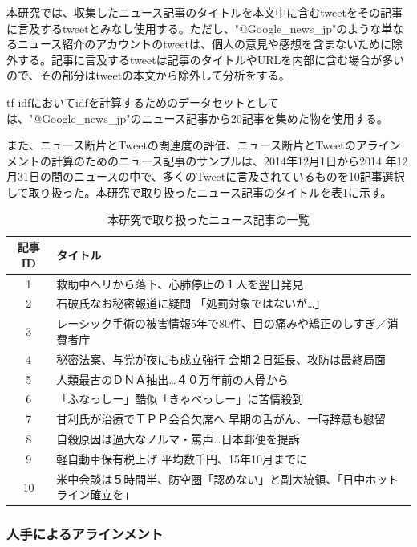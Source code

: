 \documentclass[12pt]{jarticle}
\begin{document}
本研究では、収集したニュース記事のタイトルを本文中に含むtweetをその記事に言及するtweetとみなし使用する。ただし、"@Google\_news\_jp"のような単なるニュース紹介のアカウントのtweetは、個人の意見や感想を含まないために除外する。記事に言及するtweetは記事のタイトルやURLを内部に含む場合が多いので、その部分はtweetの本文から除外して分析をする。

tf-idfにおいてidfを計算するためのデータセットとしては、"@Google\_news\_jp"のニュース記事から20記事を集めた物を使用する。

また、ニュース断片とTweetの関連度の評価、ニュース断片とTweetのアラインメントの計算のためのニュース記事のサンプルは、2014年12月1日から2014
年12月31日の間のニュースの中で、多くのTweetに言及されているものを10記事選択して取り扱った。本研究で取り扱ったニュース記事のタイトルを表\ref{news_table}に示す。

\begin{table}
\begin{center}
\caption{本研究で取り扱ったニュース記事の一覧}
\label{news_table}
\begin{tabular}[t]{|c||l|}
  \hline
  記事ID & タイトル \\
  \hline
  \hline
1 & 救助中ヘリから落下、心肺停止の１人を翌日発見 \\ \hline
2 & 石破氏なお秘密報道に疑問 「処罰対象ではないが…」 \\ \hline
3 & レーシック手術の被害情報5年で80件、目の痛みや矯正のしすぎ／消費者庁 \\ \hline
4 & 秘密法案、与党が夜にも成立強行 会期２日延長、攻防は最終局面 \\ \hline
5 & 人類最古のＤＮＡ抽出…４０万年前の人骨から \\ \hline
6 & 「ふなっしー」酷似「きゃべっしー」に苦情殺到 \\ \hline
7 & 甘利氏が治療でＴＰＰ会合欠席へ 早期の舌がん、一時辞意も慰留 \\ \hline
8 & 自殺原因は過大なノルマ・罵声…日本郵便を提訴 \\ \hline
9 & 軽自動車保有税上げ 平均数千円、15年10月までに \\ \hline
10 & 米中会談は５時間半、防空圏「認めない」と副大統領、「日中ホットライン確立を」 \\ \hline
\end{tabular}
\end{center}
\end{table}

\subsubsection{人手によるアラインメント}
\end{document}
